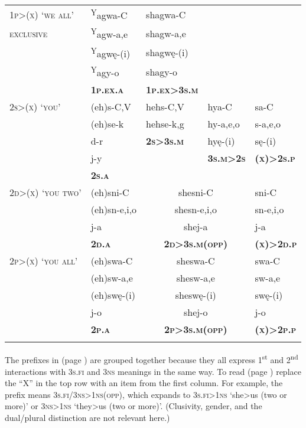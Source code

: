 \begin{table}
\begin{tabular}{lllll}
\cmidrule{1-3}
\textsc{1p>(x) `we all'}& \textsuperscript{Y}agwa-C & shagwa-C & & \\
\textsc{exclusive} & \textsuperscript{Y}agw-a,e & shagw-a,e & & \\
 & \textsuperscript{Y}agwę-(i) & shagwę-(i) & & \\
 & \textsuperscript{Y}agy-o & shagy-o & & \\
 & \textbf{\textsc{1p.ex.a}} & \textbf{\textsc{1p.ex>3s.m}} & & \\
 \midrule
\textsc{2s>(x) `you'} & (eh)s-C,V & hehs-C,V & hya-C& sa-C \\
 & (eh)se-k & hehse-k,g & hy-a,e,o & s-a,e,o \\
 & d-r & \textbf{\textsc{2s>3s.m}} & hyę-(i) & sę-(i)\\
 & j-y & & \textbf{\textsc{3s.m>2s}} & \textbf{\textsc{(x)>2s.p}}  \\
 & \textbf{\textsc{2s.a}} & & & \\
\midrule
 \textsc{2d>(x) `you two'} & (eh)sni-C & \multicolumn{2}{c}{shesni-C} & sni-C \\
& (eh)sn-e,i,o & \multicolumn{2}{c}{shesn-e,i,o} & sn-e,i,o \\
& j-a & \multicolumn{2}{c}{shej-a} & j-a\\
& \textbf{\textsc{2d.a}} & \multicolumn{2}{c}{\textbf{\textsc{2d>3s.m(opp)}}} & \textbf{\textsc{(x)>2d.p}} \\
\midrule
\textsc{2p>(x) `you all'} & (eh)swa-C & \multicolumn{2}{c}{sheswa-C} & swa-C \\
 & (eh)sw-a,e & \multicolumn{2}{c}{shesw-a,e} & sw-a,e \\
 & (eh)swę-(i) & \multicolumn{2}{c}{sheswę-(i)} & swę-(i)\\
 & j-o & \multicolumn{2}{c}{shej-o} & j-o\\
  & \textbf{\textsc{2p.a}} & \multicolumn{2}{c}{\textbf{\textsc{2p>3s.m(opp)}}} & \textbf{\textsc{(x)>2p.p}}\\
\lspbottomrule
\end{tabular}
\end{table}

The prefixes in  (page \pageref{figtab:1,2, 3fi, 3nsg interactions}) are grouped together because they all express 1\textsuperscript{st} and 2\textsuperscript{nd} interactions with \textsc{3s.fi} and \textsc{3ns} meanings in the same way. To read  (page \pageref{figtab:1,2, 3fi, 3nsg interactions}) replace the “X” in the top row with an item from the first column. For example, the  prefix means \textsc{3s.fi/3ns>1ns(opp)}, which expands to \textsc{3s.fi>1ns} ‘she>us (two or more)’  or \textsc{3ns>1ns} ‘they>us (two or more)’. (Clusivity, gender, and the dual/plural distinction are not relevant here.)

